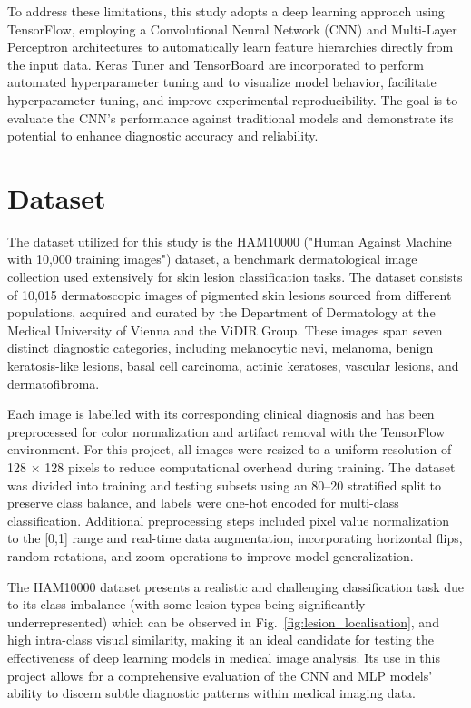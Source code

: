 \documentclass[conference]{IEEEtran}
\begin{document}
	To address these limitations, this study adopts a deep learning approach using TensorFlow, employing a Convolutional Neural Network (CNN) and Multi-Layer Perceptron architectures to automatically learn feature hierarchies directly from the input data. Keras Tuner and TensorBoard are incorporated to perform automated hyperparameter tuning and to visualize model behavior, facilitate hyperparameter tuning, and improve experimental reproducibility. The goal is to evaluate the CNN’s performance against traditional models and demonstrate its potential to enhance diagnostic accuracy and reliability.
	\section{Dataset}
	
	The dataset utilized for this study is the HAM10000 ("Human Against Machine with 10,000 training images") dataset, a benchmark dermatological image collection used extensively for skin lesion classification tasks. The dataset consists of 10,015 dermatoscopic images of pigmented skin lesions sourced from different populations, acquired and curated by the Department of Dermatology at the Medical University of Vienna and the ViDIR Group. These images span seven distinct diagnostic categories, including melanocytic nevi, melanoma, benign keratosis-like lesions, basal cell carcinoma, actinic keratoses, vascular lesions, and dermatofibroma.\cite{ham}
	
	Each image is labelled with its corresponding clinical diagnosis and has been preprocessed for color normalization and artifact removal with the TensorFlow environment. For this project, all images were resized to a uniform resolution of 128 × 128 pixels to reduce computational overhead during training. The dataset was divided into training and testing subsets using an 80–20 stratified split to preserve class balance, and labels were one-hot encoded for multi-class classification. Additional preprocessing steps included pixel value normalization to the [0,1] range and real-time data augmentation, incorporating horizontal flips, random rotations, and zoom operations to improve model generalization.
	
	The HAM10000 dataset presents a realistic and challenging classification task due to its class imbalance (with some lesion types being significantly underrepresented) which can be observed in Fig.~\ref{fig:lesion_localisation}, and high intra-class visual similarity, making it an ideal candidate for testing the effectiveness of deep learning models in medical image analysis. Its use in this project allows for a comprehensive evaluation of the CNN and MLP models’ ability to discern subtle diagnostic patterns within medical imaging data.
\end{document}
